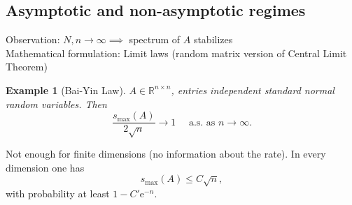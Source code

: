 \documentclass[13pt]{article}
\theoremstyle{plain}
\newtheorem*{ex}{Example}
\newcommand{\R}{\mathbb{R}}
\newcommand{\e}{\mathrm{e}}
\begin{document}
\subsection{Asymptotic and non-asymptotic regimes}

Observation: $N, n \to \infty \implies $ spectrum of $A$ stabilizes \\
Mathematical formulation: Limit laws (random matrix version of Central Limit Theorem)

\begin{ex}[Bai-Yin Law]
    $A \in \R^{n \times n}$, entries independent standard normal random variables.
    Then
    \[
        \frac{s_{\max}(A)}{2\sqrt{n}} \to 1 \quad \text{ a.s. as } n \to \infty.
    \]
\end{ex}

Not enough for finite dimensions (no information about the rate). In every dimension one has
\[
    s_{\max}(A) \le C\sqrt{n},
\]
with probability at least $1 - C'\e^{-n}$.

\newpage

\printbibliography
\end{document}
